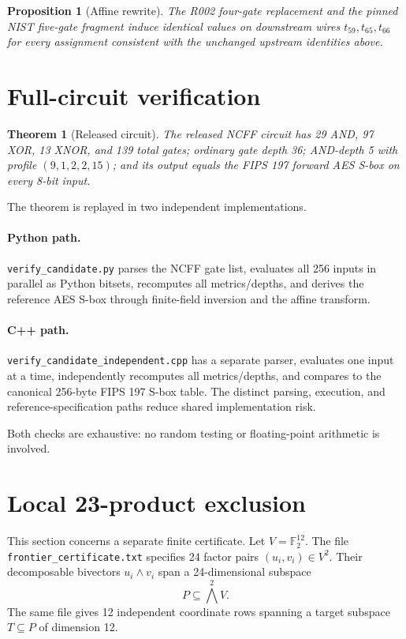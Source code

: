 \documentclass[11pt]{article}
\newcommand{\F}{\mathbb{F}}
\newtheorem{theorem}{Theorem}
\newtheorem{proposition}{Proposition}
\begin{document}
\begin{proposition}[Affine rewrite]
The R002 four-gate replacement and the pinned NIST five-gate fragment induce identical values on downstream wires \(t_{59},t_{65},t_{66}\) for every assignment consistent with the unchanged upstream identities above.
\end{proposition}

\section{Full-circuit verification}
\begin{theorem}[Released circuit]\label{thm:circuit}
The released NCFF circuit has 29 AND, 97 XOR, 13 XNOR, and 139 total gates; ordinary gate depth 36; AND-depth 5 with profile \((9,1,2,2,15)\); and its output equals the FIPS 197 forward AES S-box on every 8-bit input.
\end{theorem}

The theorem is replayed in two independent implementations.

\paragraph{Python path.}
\texttt{verify\_candidate.py} parses the NCFF gate list, evaluates all 256 inputs in parallel as Python bitsets, recomputes all metrics/depths, and derives the reference AES S-box through finite-field inversion and the affine transform.

\paragraph{C++ path.}
\texttt{verify\_candidate\_independent.cpp} has a separate parser, evaluates one input at a time, independently recomputes all metrics/depths, and compares to the canonical 256-byte FIPS 197 S-box table.  The distinct parsing, execution, and reference-specification paths reduce shared implementation risk.

Both checks are exhaustive: no random testing or floating-point arithmetic is involved.

\section{Local 23-product exclusion}\label{sec:frontier}
This section concerns a separate finite certificate.  Let \(V=\F_2^{12}\).  The file \texttt{frontier\_certificate.txt} specifies 24 factor pairs \((u_i,v_i)\in V^2\).  Their decomposable bivectors \(u_i\wedge v_i\) span a 24-dimensional subspace
\[
  P\subseteq \bigwedge
  ^2 V.
\]
The same file gives 12 independent coordinate rows spanning a target subspace \(T\subseteq P\) of dimension 12.
\end{document}
